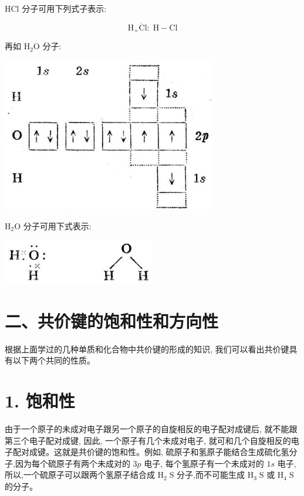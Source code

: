 \documentclass[10pt]{article}
\begin{document}
\(\mathrm{{HCl}}\) 分子可用下列式子表示:

\[
{\mathrm{H}}_{ \times }\ddot{\mathrm{{Cl}}} : \;\mathrm{H} - \mathrm{{Cl}}
\]

再如 \({\mathrm{H}}_{2}\mathrm{O}\) 分子:

\begin{center}
\includegraphics[max width=0.7\textwidth]{images/01912d13-9986-7822-a012-3f3f7be99dcb_15_743845.jpg}
\end{center}

\({\mathrm{H}}_{2}\mathrm{O}\) 分子可用下式表示:

\begin{center}
\includegraphics[max width=0.5\textwidth]{images/01912d13-9986-7822-a012-3f3f7be99dcb_15_422269.jpg}
\end{center}

\section*{二、共价键的饱和性和方向性}

根据上面学过的几种单质和化合物中共价键的形成的知识, 我们可以看出共价键具有以下两个共同的性质。

\section*{1. 饱和性}

由于一个原子的未成对电子跟另一个原子的自旋相反的电子配对成键后, 就不能跟第三个电子配对成键, 因此, 一个原子有几个未成对电子, 就可和几个自旋相反的电子配对成键。这就是共价键的饱和性。例如, 硫原子和氢原子能结合生成硫化氢分子,因为每个硫原子有两个未成对的 \({3p}\) 电子, 每个氢原子有一个未成对的 \({1s}\) 电子,所以,一个硫原子可以跟两个氢原子结合成 \({\mathrm{H}}_{2}\mathrm{\;S}\) 分子,而不可能生成 \({\mathrm{H}}_{3}\mathrm{\;S}\) 或 \({\mathrm{H}}_{4}\mathrm{\;S}\) 的分子。
\end{document}
